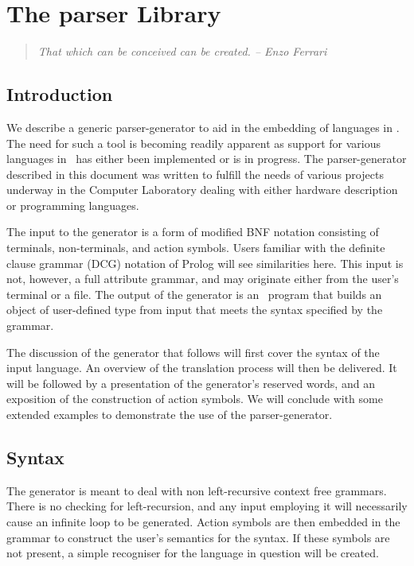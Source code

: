 \chapter{The parser Library}

\begin{quote}
\it That which can be conceived can be created. \rm -- Enzo Ferrari
\end{quote}

\section{Introduction}

  We describe a generic parser-generator to aid in the
  embedding of languages in \HOL.
  The need for such a tool is becoming readily apparent as support for various
  languages in \HOL\ has either been implemented or is in progress.  The 
  parser-generator described in this document was written to fulfill the needs
  of various projects underway in the Computer Laboratory dealing with either 
  hardware description or programming languages.

  The input to the generator is a form of modified {\small BNF}
  notation consisting 
  of terminals, non-terminals, and action symbols.  Users familiar with the
  definite clause grammar ({\small DCG}) notation of Prolog will see 
  similarities here.  This input is not, however, a full attribute grammar, and
  may originate either from the user's terminal or a file.  The output of
  the generator is an \ML\ program that builds an object of user-defined type
  from input that meets the syntax specified by the grammar.

  The discussion of the generator that follows will first cover the syntax 
  of the input language.  An overview of the translation process will 
  then be delivered.  It will be followed by a presentation of the 
  generator's reserved words, and an exposition of the construction
  of action symbols.
  We will conclude with some extended examples to demonstrate the use of
  the parser-generator.

\section{Syntax}

The generator is meant to deal with non left-recursive context free grammars.
There is no checking for left-recursion, and any input employing it will 
necessarily cause an infinite loop to be generated.  Action symbols are then
embedded in the grammar to construct the user's semantics for the
syntax.  If these symbols are not present, a simple recogniser for the 
language in question will be created.

